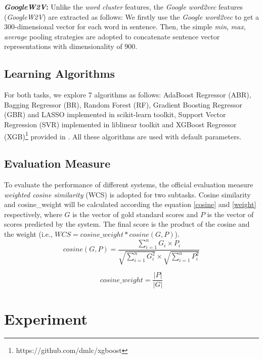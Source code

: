 \documentclass[11pt,a4paper]{article}
\begin{document}
\textbf{\emph{GoogleW2V}:}
Unlike the \emph{word cluster} features, the \emph{Google word2vec} features (\emph{GoogleW2V}) are extracted as follows: We firstly use the \emph{Google word2vec} to get a $300$-dimensional vector for each word in sentence. Then, the simple \emph{min}, \emph{max}, \emph{average} pooling strategies are adopted to concatenate sentence vector representations with dimensionality of $900$.




\subsection{Learning Algorithms}

For both tasks, we explore 7 algorithms as follows: AdaBoost Regressor (ABR), Bagging Regressor (BR), Random Forest (RF), Gradient Boosting Regressor (GBR) and LASSO implemented in scikit-learn toolkit\cite{pedregosa2011scikit}, Support Vector Regression (SVR) implemented in liblinear toolkit\cite{fan2008liblinear} and XGBoost Regressor (XGB)\footnote{https://github.com/dmlc/xgboost} provided in \cite{friedman2001greedy}. All these algorithms are used with default parameters.

\subsection{Evaluation Measure}

To evaluate the performance of different systems, the official evaluation measure \emph{weighted cosine similarity} (WCS) is adopted for two subtasks. Cosine similarity and cosine\_weight will be calculated according the equation \ref{cosine} and \ref{weight} respectively, where $G$ is the vector of gold standard scores and $P$ is the vector of scores predicted by the system. The final score is the product of the cosine and the weight (i.e., $ WCS = cosine\_weight * cosine(G, P) $).
\begin{equation}\label{cosine}
cosine(G, P) = \frac{\sum_{i=1}^{n} G_{i} \times P_{i}} {\sqrt{\sum_{i=1}^n G_{i}^{2} } \times  \sqrt{\sum_{i=1}^n P_{i}^{2} }}
\end{equation}

\begin{equation}\label{weight}
cosine\_weight =  \frac{|P|} {|G|}
\end{equation}




\section{Experiment}
\end{document}
